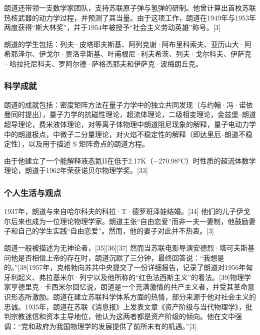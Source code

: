 朗道还带领一支数学家团队，支持苏联原子弹与氢弹的研制。他曾计算出首枚苏联热核武器的动力学过程，并预测了其当量。由于这项工作，朗道在1949年与1953年两度获得“斯大林奖”，并于1954年被授予“社会主义劳动英雄”称号。[3]

朗道的学生包括：列夫·皮塔耶夫斯基、阿列克谢·阿布里科索夫、亚历山大·阿希耶泽尔、伊戈尔·贾洛辛斯基、叶甫根尼·利夫希茨、列夫·戈尔科夫、伊萨克·哈拉托尼科夫、罗阿尔德·萨格杰耶夫和伊萨克·波梅朗丘克。
\subsubsection{科学成就}
朗道的成就包括：密度矩阵方法在量子力学中的独立共同发现（与约翰·冯·诺依曼同时提出），量子力学的抗磁性理论，超流体理论，二级相变理论，金兹堡–朗道超导理论，费米液体理论，对等离子体物理中朗道阻尼现象的解释，量子电动力学中的朗道极点，中微子二分量理论，对火焰不稳定性的解释（即达里厄–朗道不稳定性），以及用于描述 S 矩阵奇点的朗道方程。

由于他建立了一个能解释液态氦II在低于2.17K（−270.98°C）时性质的超流体数学理论，朗道于1962年荣获诺贝尔物理学奖。[33]
\subsubsection{个人生活与观点}
1937年，朗道与来自哈尔科夫的科拉·T·德罗班泽娃结婚。[34] 他们的儿子伊戈尔后来也成为一位理论物理学家。朗道主张“自由恋爱”而非一夫一妻制，他鼓励妻子和自己的学生实践“自由恋爱”。然而，他的妻子对此并不热衷。[3]

朗道一般被描述为无神论者，[35][36][37] 然而当苏联电影导演安德烈·塔可夫斯基问他是否相信上帝的存在时，朗道沉默了三分钟，最终回答说：“我想是的。”[38]1957年，克格勃向苏共中央提交了一份详细报告，记录了朗道对1956年匈牙利起义、弗拉基米尔·列宁以及他所称的“红色法西斯主义”的看法。[39]物理学家亨德里克·卡西米尔回忆说，朗道是一个充满激情的共产主义者，并受其革命意识形态所激励。朗道在建立苏联科学体系方面的热情，部分来源于他对社会主义的忠诚。1935年，朗道在苏联《消息报》上发表文章《资产阶级与当代物理学》，批判宗教迷信和资本主导地位，他认为这两者都是资产阶级的倾向。他在文中强调：“党和政府为我国物理学的发展提供了前所未有的机遇。”[3]
